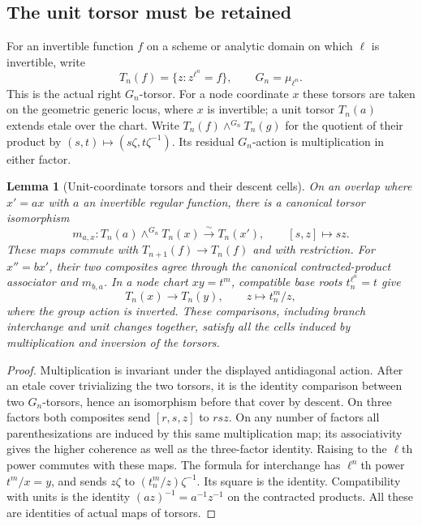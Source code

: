 \documentclass[11pt]{article}
\newtheorem{lemma}[theorem]{Lemma}
\theoremstyle{definition}
\theoremstyle{remark}
\begin{document}
\subsection{The unit torsor must be retained}
For an invertible function $f$ on a scheme or analytic domain on which
$\ell$ is invertible, write
\[
 T_n(f)=\{z:z^{\ell^n}=f\},\qquad G_n=\mu_{\ell^n}.
\]
This is the actual right $G_n$-torsor.  For a node coordinate $x$
these torsors are taken on the geometric generic locus, where $x$
is invertible; a unit torsor $T_n(a)$ extends etale over the chart.
Write
$T_n(f)\mathbin{\wedge^{G_n}}T_n(g)$ for the quotient of their
product by $(s,t)\mapsto(s\zeta,t\zeta^{-1})$.
Its residual $G_n$-action is multiplication in either factor.

\begin{lemma}[Unit-coordinate torsors and their descent cells]
\label{lem:unit-torsor-overlap}
On an overlap where $x'=a x$ with $a$ an invertible regular function,
there is a canonical torsor isomorphism
\[
 m_{a,x}:T_n(a)\mathbin{\wedge^{G_n}}T_n(x)
       \xrightarrow{\sim}T_n(x'),\qquad [s,z]\longmapsto sz.
\]
These maps commute with $T_{n+1}(f)\to T_n(f)$ and with restriction.
For $x''=b x'$, their two composites agree through the canonical
contracted-product associator and $m_{b,a}$.  In a node chart
$xy=t^m$, compatible base roots $t_n^{\ell^n}=t$ give
\[
 T_n(x)\longrightarrow T_n(y),\qquad z\longmapsto t_n^m/z,
\]
where the group action is inverted.  These comparisons, including
branch interchange and unit changes together, satisfy all the cells
induced by multiplication and inversion of the torsors.
\end{lemma}
\begin{proof}
Multiplication is invariant under the displayed antidiagonal action.
After an etale cover trivializing the two torsors, it is the identity
comparison between two $G_n$-torsors, hence an isomorphism before that
cover by descent.  On three factors both composites send
$[r,s,z]$ to $rsz$.  On any number of factors all parenthesizations
are induced by this same multiplication map; its associativity gives
the higher coherence as well as the three-factor identity.
Raising to the $\ell$th power commutes with these maps.  The formula
for interchange has $\ell^n$th power $t^m/x=y$, and sends $z\zeta$
to $(t_n^m/z)\zeta^{-1}$.  Its square is the identity.  Compatibility
with units is the identity $(az)^{-1}=a^{-1}z^{-1}$ on the contracted
products.  All these are identities of actual maps of torsors.
\end{proof}
\end{document}
